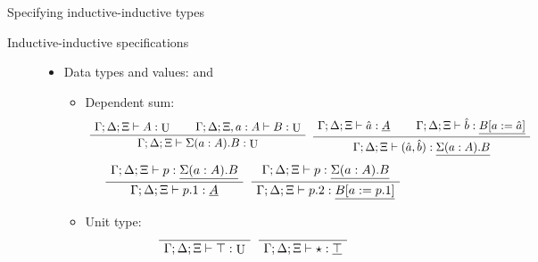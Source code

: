 \documentclass[acmsmall,review]{acmart}\settopmatter{printfolios=true,printccs=false,printacmref=false}
\newenvironment{bprooftree}
  {\leavevmode\hbox\bgroup}
  {\DisplayProof\egroup}
\DeclareMathOperator{\UU}{U}
\newcommand{\tac}{\vdash}
\begin{document}
\begin{section}{Specifying inductive-inductive types}
\begin{subsection}{Inductive-inductive specifications}
\begin{figure}[htpb]
\begin{itemize}
        \item Data types and values: \hfill \boxed{\Gamma; \Delta; \Xi \tac A : \UU} and \boxed{\Gamma; \Delta; \Xi \tac a : \underline{A}}
        \begin{itemize}
            \item Dependent sum:
            \[
                \begin{bprooftree}
                    \AxiomC{$\Gamma ; \Delta ; \Xi \tac A : \UU$}\AxiomC{$\Gamma ; \Delta ; \Xi , a : A \tac B : \UU$}\BinaryInfC{$\Gamma ; \Delta ; \Xi \tac \Sigma(a : A).B : \UU$}
                \end{bprooftree}
                \begin{bprooftree}
                    \AxiomC{$\Gamma ; \Delta ; \Xi \tac \hat{a} : \underline{A}$}\AxiomC{$\Gamma ; \Delta ; \Xi \tac \hat{b} : \underline{B[a := \hat{a}]}$}\BinaryInfC{$\Gamma ; \Delta ; \Xi \tac (\hat{a} , \hat{b}) : \underline{\Sigma(a : A).B}$}
                \end{bprooftree}
            \]
            \[
                \begin{bprooftree}
                    \AxiomC{$\Gamma ; \Delta ; \Xi \tac p : \underline{\Sigma(a : A).B}$}\UnaryInfC{$\Gamma ; \Delta ; \Xi \tac p .1 : \underline{A}$}
                \end{bprooftree}
                \begin{bprooftree}
                    \AxiomC{$\Gamma ; \Delta ; \Xi \tac p : \underline{\Sigma(a : A).B}$}\UnaryInfC{$\Gamma ; \Delta ; \Xi \tac p .2 : \underline{B[a := p .1]}$}
                \end{bprooftree}
            \]
        
            \item Unit type:
            \[
                \begin{bprooftree}
                    \AxiomC{}\UnaryInfC{$\Gamma ; \Delta ; \Xi \tac \top : \UU$}
                \end{bprooftree}
                \begin{bprooftree}
                    \AxiomC{}\UnaryInfC{$\Gamma ; \Delta ; \Xi \tac \star : \underline{\top}$}
                \end{bprooftree}
            \]
        

\end{itemize}
\end{itemize}
\end{figure}
\end{subsection}
\end{section}
\end{document}
